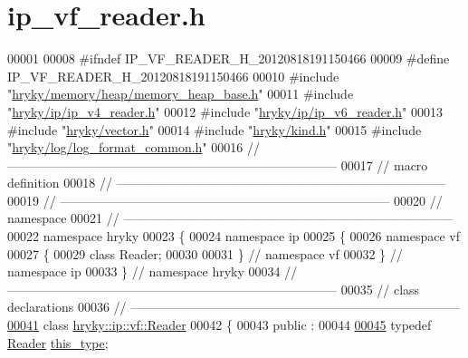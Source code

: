 \hypertarget{ip__vf__reader_8h_source}{\section{ip\-\_\-vf\-\_\-reader.\-h}
}

\begin{DoxyCode}
00001 
00008 \textcolor{preprocessor}{#ifndef IP\_VF\_READER\_H\_20120818191150466}
00009 \textcolor{preprocessor}{}\textcolor{preprocessor}{#define IP\_VF\_READER\_H\_20120818191150466}
00010 \textcolor{preprocessor}{}\textcolor{preprocessor}{#include "\hyperlink{memory__heap__base_8h}{hryky/memory/heap/memory_heap_base.h}"}
00011 \textcolor{preprocessor}{#include "\hyperlink{ip__v4__reader_8h}{hryky/ip/ip_v4_reader.h}"}
00012 \textcolor{preprocessor}{#include "\hyperlink{ip__v6__reader_8h}{hryky/ip/ip_v6_reader.h}"}
00013 \textcolor{preprocessor}{#include "\hyperlink{vector_8h}{hryky/vector.h}"}
00014 \textcolor{preprocessor}{#include "\hyperlink{kind_8h}{hryky/kind.h}"}
00015 \textcolor{preprocessor}{#include "\hyperlink{log__format__common_8h}{hryky/log/log_format_common.h}"}
00016 \textcolor{comment}{//
      ------------------------------------------------------------------------------}
00017 \textcolor{comment}{// macro definition}
00018 \textcolor{comment}{//
      ------------------------------------------------------------------------------}
00019 \textcolor{comment}{//
      ------------------------------------------------------------------------------}
00020 \textcolor{comment}{// namespace}
00021 \textcolor{comment}{//
      ------------------------------------------------------------------------------}
00022 \textcolor{keyword}{namespace }hryky
00023 \{
00024 \textcolor{keyword}{namespace }ip
00025 \{
00026 \textcolor{keyword}{namespace }vf
00027 \{
00029     \textcolor{keyword}{class }Reader;
00030 
00031 \} \textcolor{comment}{// namespace vf}
00032 \} \textcolor{comment}{// namespace ip}
00033 \} \textcolor{comment}{// namespace hryky}
00034 \textcolor{comment}{//
      ------------------------------------------------------------------------------}
00035 \textcolor{comment}{// class declarations}
00036 \textcolor{comment}{//
      ------------------------------------------------------------------------------}
\hypertarget{ip__vf__reader_8h_source_l00041}{}\hyperlink{classhryky_1_1ip_1_1vf_1_1_reader}{00041} \textcolor{comment}{}\textcolor{keyword}{class }\hyperlink{classhryky_1_1ip_1_1vf_1_1_reader}{hryky::ip::vf::Reader}
00042 \{
00043 \textcolor{keyword}{public} :
00044 
\hypertarget{ip__vf__reader_8h_source_l00045}{}\hyperlink{classhryky_1_1ip_1_1vf_1_1_reader_a6a4fdf2ae2b33a48f43ae2aafaa93e12}{00045}     \textcolor{keyword}{typedef} \hyperlink{classhryky_1_1ip_1_1vf_1_1_reader}{Reader} \hyperlink{classhryky_1_1ip_1_1vf_1_1_reader_a6a4fdf2ae2b33a48f43ae2aafaa93e12}{this_type};

\end{DoxyCode}
